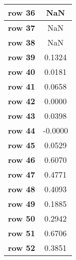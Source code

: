 \begin{tiny}
\begin{tabular}{|l|c|}
\textbf{row 36}&NaN\\\hline
\textbf{row 37}&NaN\\\hline
\textbf{row 38}&NaN\\\hline
\textbf{row 39}&0.1324\\\hline
\textbf{row 40}&0.0181\\\hline
\textbf{row 41}&0.0658\\\hline
\textbf{row 42}&0.0000\\\hline
\textbf{row 43}&0.0398\\\hline
\textbf{row 44}&-0.0000\\\hline
\textbf{row 45}&0.0529\\\hline
\textbf{row 46}&0.6070\\\hline
\textbf{row 47}&0.4771\\\hline
\textbf{row 48}&0.4093\\\hline
\textbf{row 49}&0.1885\\\hline
\textbf{row 50}&0.2942\\\hline
\textbf{row 51}&0.6706\\\hline
\textbf{row 52}&0.3851\\\hline
\end{tabular}
\end{tiny}